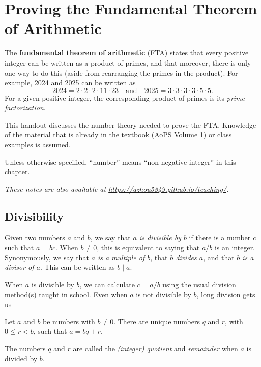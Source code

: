 \section{Proving the Fundamental Theorem of Arithmetic}

The \textbf{fundamental theorem of arithmetic} (FTA) states that every positive integer can be written as a product of primes, and that moreover, there is only one way to do this (aside from rearranging the primes in the product). For example, 2024 and 2025 can be written as
\begin{equation*}
2024 = 2\cdot 2\cdot 2\cdot 11\cdot 23\quad\text{and}\quad 2025 = 3\cdot 3\cdot 3\cdot 3\cdot 5\cdot 5.
\end{equation*}
For a given positive integer, the corresponding product of primes is its \emph{prime factorization}.

This handout discusses the number theory needed to prove the FTA. Knowledge of the material that is already in the textbook (AoPS Volume 1) or class examples is assumed.

\begin{convention}
Unless otherwise specified, ``number'' means ``non-negative integer'' in this chapter.
\end{convention}

\textit{These notes are also available at \url{https://azhou5849.github.io/teaching/}.}


\subsection{Divisibility}

Given two numbers $a$ and $b$, we say that \emph{$a$ is divisible by $b$} if there is a number $c$ such that $a = bc$. When $b\neq 0$, this is equivalent to saying that $a/b$ is an integer. Synonymously, we say that \emph{$a$ is a multiple of $b$}, that \emph{$b$ divides $a$}, and that \emph{$b$ is a divisor of $a$}. This can be written as $b\mid a$.

When $a$ is divisible by $b$, we can calculate $c = a/b$ using the usual division method(s) taught in school. Even when $a$ is not divisible by $b$, long division gets us
\begin{proposition}\label{prop:div-algo}
Let $a$ and $b$ be numbers with $b\neq 0$. There are unique numbers $q$ and $r$, with $0\leq r < b$, such that $a = bq + r$.
\end{proposition}
The numbers $q$ and $r$ are called the \emph{(integer) quotient} and \emph{remainder} when $a$ is divided by $b$.



